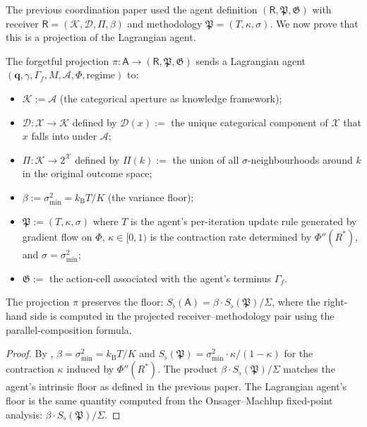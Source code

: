 \documentclass[11pt,twocolumn,a4paper]{article}
\newcommand{\K}{\mathcal{K}}
\newcommand{\D}{\mathcal{D}}
\newcommand{\X}{\mathcal{X}}
\newcommand{\Aper}{\mathcal{A}}
\newcommand{\Method}{\mathfrak{P}}
\newcommand{\Goal}{\mathfrak{G}}
\newcommand{\receiver}{\mathsf{R}}
\newcommand{\agent}{\mathsf{A}}
\newcommand{\Sfloor}{S_{\flat}}
\newcommand{\qvec}{\mathbf{q}}
\newcommand{\Pot}{\Phi}
\newcommand{\kB}{k_{\mathrm{B}}}
\begin{document}
The previous coordination paper used the agent definition
$(\receiver,\Method,\Goal)$ with receiver $\receiver=(\K,\D,\Pi,\beta)$
and methodology $\Method=(T,\kappa,\sigma)$. We now prove that this is
a projection of the Lagrangian agent.

\begin{definition}\label{def:proj}
The forgetful projection
$\pi:\agent\to(\receiver,\Method,\Goal)$ sends a Lagrangian agent
$(\qvec,\gamma,\Gamma_f,M,\Aper,\Pot,\mathrm{regime})$ to:
\begin{itemize}[leftmargin=*]
\item $\K:=\Aper$ (the categorical aperture as knowledge framework);
\item $\D:\X\to\K$ defined by $\D(x):=$ the unique categorical
component of $\X$ that $x$ falls into under $\Aper$;
\item $\Pi:\K\to 2^\X$ defined by $\Pi(k):=$ the union of all
$\sigma$-neighbourhoods around $k$ in the original outcome space;
\item $\beta:=\sigma^2_{\min}=\kB T/K$ (the variance floor);
\item $\Method:=(T,\kappa,\sigma)$ where $T$ is the agent's per-iteration
update rule generated by gradient flow on $\Pot$, $\kappa\in[0,1)$ is
the contraction rate determined by $\Pot''(R^*)$, and
$\sigma=\sigma^2_{\min}$;
\item $\Goal:=$ the action-cell associated with the agent's terminus
$\Gamma_f$.
\end{itemize}
\end{definition}

\begin{theorem}\label{thm:proj-consist}
The projection $\pi$ preserves the floor: $\Sfloor(\agent)=\beta\cdot
\Sfloor(\Method)/\Sigma$, where the right-hand side is computed in the
projected receiver--methodology pair using the parallel-composition
formula.
\end{theorem}

\begin{proof}
By , $\beta=\sigma^2_{\min}=\kB T/K$ and
$\Sfloor(\Method)=\sigma^2_{\min}\cdot\kappa/(1-\kappa)$ for the
contraction $\kappa$ induced by $\Pot''(R^*)$. The product
$\beta\cdot\Sfloor(\Method)/\Sigma$ matches the agent's intrinsic
floor as defined in the previous paper. The Lagrangian agent's
floor is the same quantity computed from the Onsager--Machlup
fixed-point analysis: $\beta\cdot\Sfloor(\Method)/\Sigma$.
\end{proof}
\end{document}

